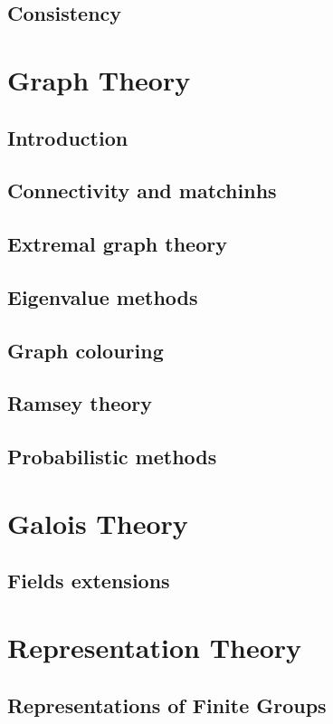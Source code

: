 \documentclass[12pt]{book}
\theoremstyle{definition}
\theoremstyle{remark}
\begin{document}
		\section{Consistency}
		
	\chapter{Graph Theory}
		\section{Introduction}
		
		\section{Connectivity and matchinhs}
		
		\section{Extremal graph theory}
		
		\section{Eigenvalue methods}
		
		\section{Graph colouring}
		
		\section{Ramsey theory}
		
		\section{Probabilistic methods}
	\chapter{Galois Theory}
		\section{Fields extensions}
	\chapter{Representation Theory}
		\section{Representations of Finite Groups}
\end{document}
